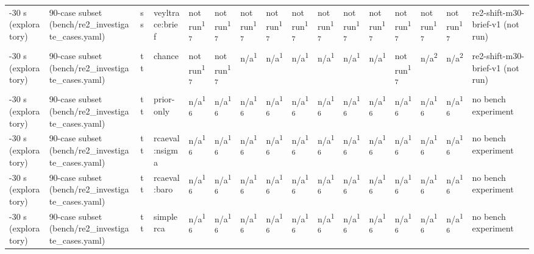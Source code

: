 \begin{table}[t]
\begin{tabular}{llllllllllllllll}
-30 s (exploratory) & 90-case subset (bench/re2\_investigate\_cases.yaml) & ss & veyltrace:brief & not run\textsuperscript{17} & not run\textsuperscript{17} & not run\textsuperscript{17} & not run\textsuperscript{17} & not run\textsuperscript{17} & not run\textsuperscript{17} & not run\textsuperscript{17} & not run\textsuperscript{17} & not run\textsuperscript{17} & not run\textsuperscript{17} & not run\textsuperscript{17} & re2-shift-m30-brief-v1 (not run) \\
-30 s (exploratory) & 90-case subset (bench/re2\_investigate\_cases.yaml) & tt & chance & not run\textsuperscript{17} & not run\textsuperscript{17} & n/a\textsuperscript{1} & n/a\textsuperscript{1} & n/a\textsuperscript{1} & n/a\textsuperscript{1} & n/a\textsuperscript{1} & n/a\textsuperscript{1} & not run\textsuperscript{17} & n/a\textsuperscript{2} & n/a\textsuperscript{2} & re2-shift-m30-brief-v1 (not run) \\
-30 s (exploratory) & 90-case subset (bench/re2\_investigate\_cases.yaml) & tt & prior-only & n/a\textsuperscript{16} & n/a\textsuperscript{16} & n/a\textsuperscript{16} & n/a\textsuperscript{16} & n/a\textsuperscript{16} & n/a\textsuperscript{16} & n/a\textsuperscript{16} & n/a\textsuperscript{16} & n/a\textsuperscript{16} & n/a\textsuperscript{16} & n/a\textsuperscript{16} & no bench experiment \\
-30 s (exploratory) & 90-case subset (bench/re2\_investigate\_cases.yaml) & tt & rcaeval:nsigma & n/a\textsuperscript{16} & n/a\textsuperscript{16} & n/a\textsuperscript{16} & n/a\textsuperscript{16} & n/a\textsuperscript{16} & n/a\textsuperscript{16} & n/a\textsuperscript{16} & n/a\textsuperscript{16} & n/a\textsuperscript{16} & n/a\textsuperscript{16} & n/a\textsuperscript{16} & no bench experiment \\
-30 s (exploratory) & 90-case subset (bench/re2\_investigate\_cases.yaml) & tt & rcaeval:baro & n/a\textsuperscript{16} & n/a\textsuperscript{16} & n/a\textsuperscript{16} & n/a\textsuperscript{16} & n/a\textsuperscript{16} & n/a\textsuperscript{16} & n/a\textsuperscript{16} & n/a\textsuperscript{16} & n/a\textsuperscript{16} & n/a\textsuperscript{16} & n/a\textsuperscript{16} & no bench experiment \\
-30 s (exploratory) & 90-case subset (bench/re2\_investigate\_cases.yaml) & tt & simplerca & n/a\textsuperscript{16} & n/a\textsuperscript{16} & n/a\textsuperscript{16} & n/a\textsuperscript{16} & n/a\textsuperscript{16} & n/a\textsuperscript{16} & n/a\textsuperscript{16} & n/a\textsuperscript{16} & n/a\textsuperscript{16} & n/a\textsuperscript{16} & n/a\textsuperscript{16} & no bench experiment \\

\end{tabular}
\end{table}

